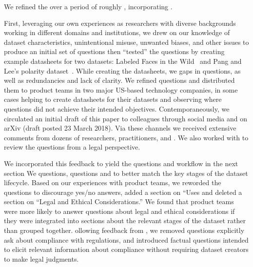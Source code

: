 We refined the  over a period of roughly ,
incorporating .

First, leveraging our own experiences as researchers with diverse
backgrounds working in different domains and institutions, we drew on
our knowledge of dataset characteristics, unintentional misuse,
unwanted  biases, and other issues to produce an initial set
of questions 
then ``tested'' the questions by creating example datasheets for two
 datasets: Labeled Faces in the Wild~\cite{lfw} and Pang
and Lee's polarity dataset~\cite{polarity}.  While creating the datasheets,
we  gaps in  questions, as well as redundancies
and lack of clarity. We  refined  questions
and distributed them to product teams in two major US-based technology
companies, in some cases helping  to create datasheets for
their datasets and observing where  questions did not
achieve their intended objectives. Contemporaneously, we circulated an
initial draft of this paper to colleagues through social media and on
arXiv (draft posted 23 March 2018). Via these channels we received
extensive comments from dozens of researchers, practitioners,
and . We also worked with 
to review the questions from a legal perspective.

We incorporated this feedback to yield the questions and workflow
 in the next section\edit{:} We 
questions,
 questions\edit{,} and 
to better match the key stages of the dataset lifecycle. Based on our
experiences with product teams, we reworded the questions to
discourage yes/no answers, added a section on ``Uses and
deleted a section on ``Legal and Ethical Considerations.'' We found
that product teams were more likely to answer questions about legal
and ethical considerations if they were integrated into sections about
the relevant stages of the dataset
 rather than grouped together. ollowing feedback
from , we removed questions  explicitly
ask about compliance with regulations, and introduced factual
questions intended to elicit relevant information about compliance
without requiring dataset creators to make legal judgments.
